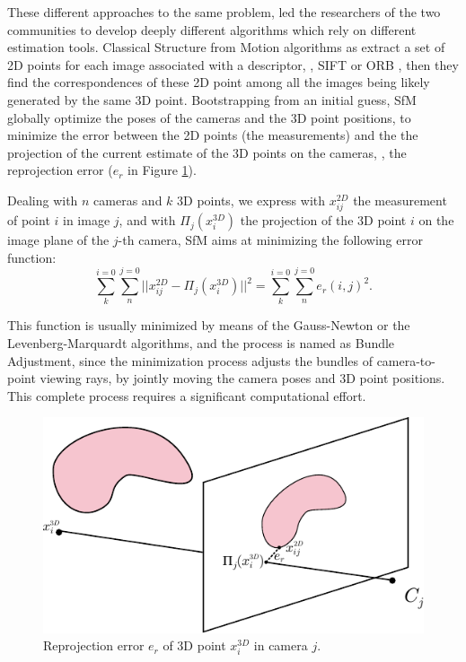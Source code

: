 These different approaches to the same problem, led the researchers of the two communities to develop deeply different algorithms which rely on different estimation tools.
Classical Structure from Motion algorithms as \cite{triggs2000bundle,sibley2009adaptive,wu2011multicore} extract a set of 2D points for each image associated with a descriptor, \eg, SIFT \cite{sift} or ORB \cite{orb},  then they find the correspondences of these 2D point among all the images being likely generated by the same 3D point. Bootstrapping from an initial guess, SfM globally optimize the poses of the cameras and the 3D point positions, to minimize the error between the 2D points (the measurements) and the the projection of the current estimate of the 3D points on the cameras, \ie, the reprojection error ($e_r$ in Figure \ref{fig:reprojectionerror}).

Dealing with $n$ cameras and $k$ 3D points, we express with $x_{ij}^{2D}$ the measurement of point $i$ in image $j$, and with $\Pi_j(x_i^{3D})$ the projection of the 3D point $i$ on the image plane of the $j$-th camera, SfM aims at minimizing the following error function:
\[
\sum_{k}^{i=0}\sum_{n}^{j=0}||x_{ij}^{2D} - \Pi_j(x_i^{3D})||^2 = \sum_{k}^{i=0}\sum_{n}^{j=0}e_r(i,j) ^2.
\]

This function is usually minimized by means of the Gauss-Newton or the Levenberg-Marquardt algorithms, and the process is named as Bundle Adjustment, since the minimization process adjusts the bundles of camera-to-point viewing rays, by jointly moving the camera poses and 3D point positions. This complete process requires a significant computational effort.

\begin{figure}[t]
\includegraphics[width=0.99\columnwidth]{./img/ch_soa/reproj}
 \caption{Reprojection error $e_r$ of 3D point $x_i^{3D}$ in camera $j$.} 
    \label{fig:reprojectionerror}
\end{figure}



